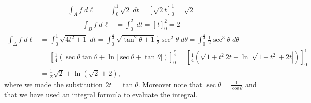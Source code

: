 \documentclass[11pt]{article}
\begin{document}
\begin{solution}   
     \begin{align*}
        \int_A f \;d\ell
        &=\int_0^1 \sqrt{2} \;dt = \left[\sqrt{2}t\right]_0^1 = \sqrt{2}
    \end{align*}
    \begin{align*}
        \int_B f \;d\ell
        &= \int_0^2 \;dt = \left[t \right]_0^2  = 2
    \end{align*}  
	\begin{align*}
        \int_\Delta f \;d\ell
        &= \int_0^1 \sqrt{4t^2 + 1} \; dt =  \int_0^{\frac{\pi}{4}} \sqrt{\tan^2\theta + 1} \frac{1}{2}\sec^2\theta \; d\theta = \int_0^{\frac{\pi}{4}}\frac{1}{2}\sec^3\theta \; d\theta\\
	&= \left[\frac{1}{4}(\sec\theta\tan\theta + \ln |\sec\theta+\tan\theta|)\right]_0^{\frac{\pi}{4}} = \left[\frac{1}{4}(\sqrt{1+t^2}2t + \ln|\sqrt{1+t^2} + 2t|)\right]_0^1 \\
&= \frac{1}{2}\sqrt{2} + \ln(\sqrt{2}+2),
    \end{align*}  
	where we made the substitution $2t = \tan\theta$. Moreover note that $\sec\theta = \frac{1}{\cos\theta}$ and that we have used an integral formula to evaluate the integral.  


\end{solution}
\end{document}
